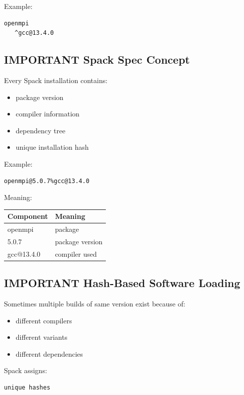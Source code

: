 \documentclass[11pt]{article}
\begin{document}
Example:

\begin{verbatim}
openmpi
   ^gcc@13.4.0
\end{verbatim}
\subsection{IMPORTANT Spack Spec Concept}
\label{sec:orge70c0d0}

Every Spack installation contains:

\begin{itemize}
\item package version
\item compiler information
\item dependency tree
\item unique installation hash
\end{itemize}

Example:

\begin{verbatim}
openmpi@5.0.7%gcc@13.4.0
\end{verbatim}

Meaning:

\begin{center}
\begin{tabular}{ll}
Component & Meaning\\
\hline
openmpi & package\\
5.0.7 & package version\\
gcc@13.4.0 & compiler used\\
\end{tabular}
\end{center}
\subsection{IMPORTANT Hash-Based Software Loading}
\label{sec:orgd80eccc}

Sometimes multiple builds of same version exist because of:

\begin{itemize}
\item different compilers
\item different variants
\item different dependencies
\end{itemize}

Spack assigns:

\begin{verbatim}
unique hashes
\end{verbatim}
\end{document}
